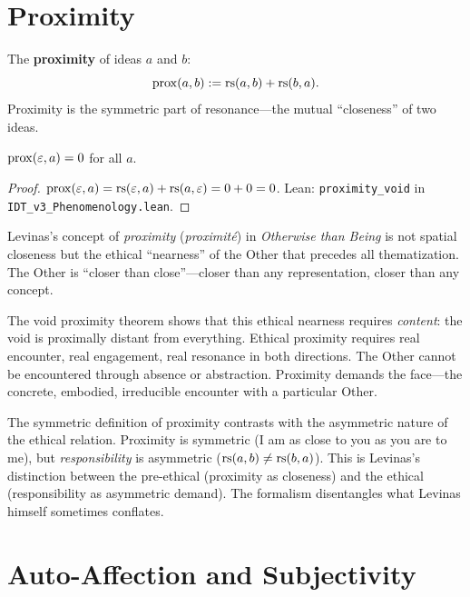 \section{Proximity}

\begin{definition}[Proximity]
\label{def:proximity}
The \textbf{proximity} of ideas $a$ and $b$:
\[
\mathrm{prox}(a, b) := \mathrm{rs}(a, b) + \mathrm{rs}(b, a).
\]
Proximity is the symmetric part of resonance---the mutual ``closeness'' of
two ideas.
\end{definition}

\begin{theorem}
\label{thm:proximity-void}
$\mathrm{prox}(\varepsilon, a) = 0$ for all $a$.
\end{theorem}

\begin{proof}
$\mathrm{prox}(\varepsilon, a) = \mathrm{rs}(\varepsilon, a) + \mathrm{rs}(a, \varepsilon) = 0 + 0 = 0$.
Lean: \texttt{proximity\_void} in \texttt{IDT\_v3\_Phenomenology.lean}.
\end{proof}

\begin{interpretation}
Levinas's concept of \emph{proximity} (\textit{proximit\'e}) in
\textit{Otherwise than Being} is not spatial closeness but the ethical
``nearness'' of the Other that precedes all thematization. The Other is
``closer than close''---closer than any representation, closer than any
concept.

The void proximity theorem shows that this ethical nearness requires
\emph{content}: the void is proximally distant from everything. Ethical
proximity requires real encounter, real engagement, real resonance in both
directions. The Other cannot be encountered through absence or abstraction.
Proximity demands the face---the concrete, embodied, irreducible encounter
with a particular Other.

The symmetric definition of proximity contrasts with the asymmetric nature
of the ethical relation. Proximity is symmetric (I am as close to you as
you are to me), but \emph{responsibility} is asymmetric ($\mathrm{rs}(a, b) \neq
\mathrm{rs}(b, a)$). This is Levinas's distinction between the pre-ethical
(proximity as closeness) and the ethical (responsibility as asymmetric demand).
The formalism disentangles what Levinas himself sometimes conflates.
\end{interpretation}

\section{Auto-Affection and Subjectivity}

